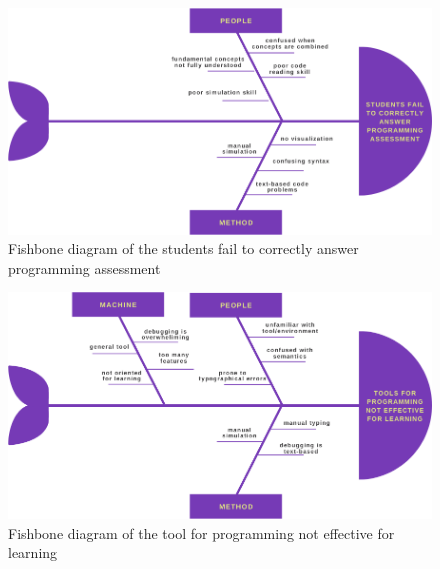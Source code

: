 \begin{doublespace}
\begin{center}
		\clearpage
		\null\vfill
		\begin{figure}[H]
			\centering
			\includegraphics[width=0.8\textheight,angle=90]{figures/fishbone2.png}
			\caption[Ishikawa Diagram 2]{Fishbone diagram of the students fail to correctly answer programming
			assessment}
			\label{fig:fishbone2}
		\end{figure}
		\vfill

		\clearpage
		\null\vfill
		\begin{figure}[H]
			\centering
			\includegraphics[width=0.8\textheight,angle=90]{figures/fishbone3.png}
			\caption[Ishikawa Diagram 3]{Fishbone diagram of the tool for programming not effective for
			learning}
			\label{fig:fishbone3}
		\end{figure}
		\vfill


\end{center}
\end{doublespace}
